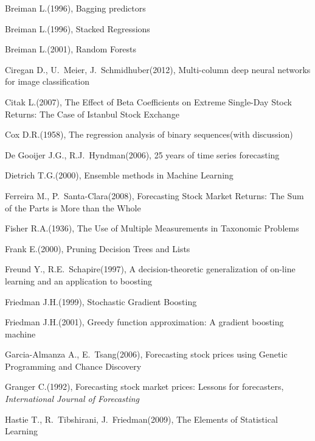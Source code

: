 \documentclass[12pt,a4paper,twoside,openany]{book}
\begin{document}
\begin{thebibliography}{99}
 Breiman L.(1996), Bagging predictors

 Breiman L.(1996), Stacked Regressions

 Breiman L.(2001), Random Forests

 Ciregan D., U.~Meier, J.~Schmidhuber(2012), Multi-column deep neural networks for image classification

 Citak L.(2007), The Effect of Beta Coefficients on Extreme Single-Day Stock Returns: The Case of Istanbul Stock Exchange

 Cox D.R.(1958), The regression analysis of binary sequences(with discussion)

 De Gooijer J.G., R.J.~Hyndman(2006), 25 years of time series forecasting

 Dietrich T.G.(2000), Ensemble methods in Machine Learning

 Ferreira M., P.~Santa-Clara(2008), Forecasting Stock Market Returns: The Sum of the Parts is More than the Whole

 Fisher R.A.(1936), The Use of Multiple Measurements in Taxonomic Problems

 Frank E.(2000), Pruning Decision Trees and Lists

 Freund Y., R.E.~Schapire(1997), A decision-theoretic generalization of on-line learning and an application to boosting

 Friedman J.H.(1999), Stochastic Gradient Boosting

 Friedman J.H.(2001), Greedy function approximation: A gradient boosting machine

 Garcia-Almanza A., E.~Tsang(2006), Forecasting stock prices using Genetic Programming and Chance Discovery

 Granger C.(1992), Forecasting stock market prices: Lessons for forecasters, \textit{International Journal of Forecasting}

 Hastie T., R.~Tibshirani, J.~Friedman(2009), The Elements of Statistical Learning


\end{thebibliography}
\end{document}
